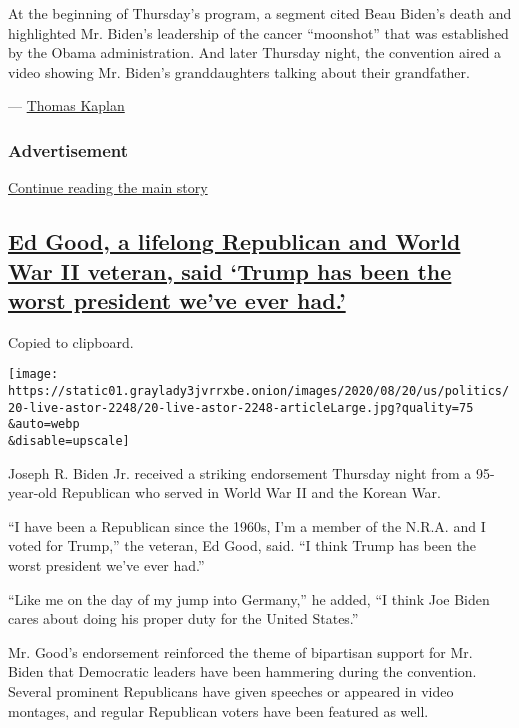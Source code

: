 At the beginning of Thursday's program, a segment cited Beau Biden's
death and highlighted Mr. Biden's leadership of the cancer ``moonshot''
that was established by the Obama administration. And later Thursday
night, the convention aired a video showing Mr. Biden's granddaughters
talking about their grandfather.

--- \href{https://www.nytimes3xbfgragh.onion/by/thomas-kaplan}{Thomas
Kaplan}

\hypertarget{advertisement-2}{%
\subsubsection{Advertisement}\label{advertisement-2}}

\protect\hyperlink{after-dfp-ad-mid3}{Continue reading the main story}

\hypertarget{ed-good-a-lifelong-republican-and-world-war-ii-veteran-said-trump-has-been-the-worst-president-weve-ever-had}{%
\subsection{\texorpdfstring{\protect\hyperlink{ed-good-a-lifelong-republican-and-world-war-ii-veteran-said-trump-has-been-the-worst-president-weve-ever-had}{Ed
Good, a lifelong Republican and World War II veteran, said `Trump has
been the worst president we've ever
had.'}}{Ed Good, a lifelong Republican and World War II veteran, said `Trump has been the worst president we've ever had.'}}\label{ed-good-a-lifelong-republican-and-world-war-ii-veteran-said-trump-has-been-the-worst-president-weve-ever-had}}

Copied to clipboard.

\texttt{[image: https://static01.graylady3jvrrxbe.onion/images/2020/08/20/us/politics/20-live-astor-2248/20-live-astor-2248-articleLarge.jpg?quality=75\\\&auto=webp\\\&disable=upscale]}

Joseph R. Biden Jr. received a striking endorsement Thursday night from
a 95-year-old Republican who served in World War II and the Korean War.

``I have been a Republican since the 1960s, I'm a member of the N.R.A.
and I voted for Trump,'' the veteran, Ed Good, said. ``I think Trump has
been the worst president we've ever had.''

``Like me on the day of my jump into Germany,'' he added, ``I think Joe
Biden cares about doing his proper duty for the United States.''

Mr. Good's endorsement reinforced the theme of bipartisan support for
Mr. Biden that Democratic leaders have been hammering during the
convention. Several prominent Republicans have given speeches or
appeared in video montages, and regular Republican voters have been
featured as well.

